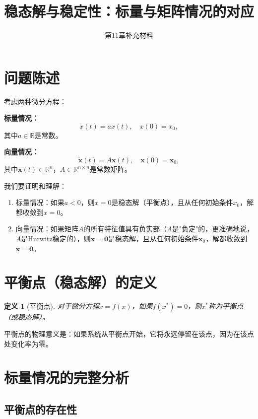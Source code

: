 \documentclass[12pt,a4paper]{article}
\title{稳态解与稳定性：标量与矩阵情况的对应}
\author{第11章补充材料}
\date{}
\newtheorem{definition}{定义}
\begin{document}
\maketitle

\section{问题陈述}

考虑两种微分方程：

\textbf{标量情况：}
\begin{equation}
\dot{x}(t) = ax(t), \quad x(0) = x_0,
\end{equation}
其中$a \in \mathbb{R}$是常数。

\textbf{向量情况：}
\begin{equation}
\dot{\mathbf{x}}(t) = A\mathbf{x}(t), \quad \mathbf{x}(0) = \mathbf{x}_0,
\end{equation}
其中$\mathbf{x}(t) \in \mathbb{R}^n$，$A \in \mathbb{R}^{n \times n}$是常数矩阵。

我们要证明和理解：
\begin{enumerate}
\item 标量情况：如果$a < 0$，则$x = 0$是稳态解（平衡点），且从任何初始条件$x_0$，解都收敛到$x = 0$。
\item 向量情况：如果矩阵$A$的所有特征值具有负实部（$A$是"负定"的，更准确地说，$A$是Hurwitz稳定的），则$\mathbf{x} = \mathbf{0}$是稳态解，且从任何初始条件$\mathbf{x}_0$，解都收敛到$\mathbf{x} = \mathbf{0}$。
\end{enumerate}

\section{平衡点（稳态解）的定义}

\begin{definition}[平衡点]
对于微分方程$\dot{x} = f(x)$，如果$f(x^*) = 0$，则$x^*$称为平衡点（或稳态解）。
\end{definition}

平衡点的物理意义是：如果系统从平衡点开始，它将永远停留在该点，因为在该点处变化率为零。

\section{标量情况的完整分析}

\subsection{平衡点的存在性}
\end{document}
